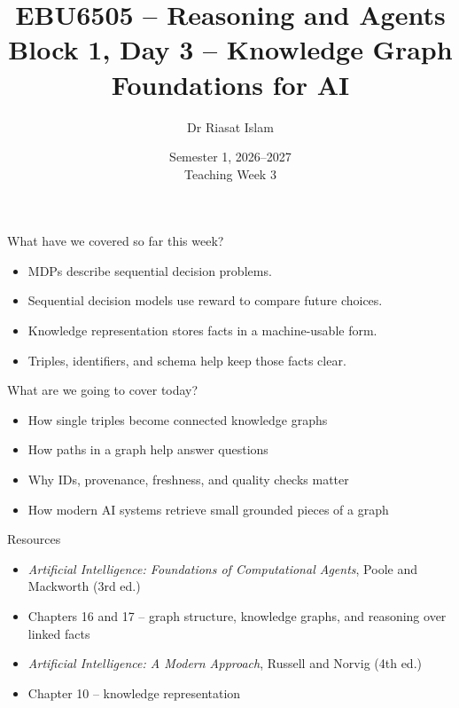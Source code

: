 \documentclass[aspectratio=169]{beamer}
\title[EBU6505 B1 D3]{EBU6505 -- Reasoning and Agents\\Block 1, Day 3 -- Knowledge Graph Foundations for AI}
\author{Dr Riasat Islam}
\institute{Queen Mary University of London}
\date[Teaching Week 3]{Semester 1, 2026--2027 \\ Teaching Week 3}
\newcommand{\defaultdeckrefs}{AIMA4e Ch.10 pp.314--343; Poole3e Ch.16--17 pp.701--766}
\newcommand{\currentsliderefs}{\defaultdeckrefs}
\newcommand{\setslideref}[1]{\gdef\currentsliderefs{#1}}
\begin{document}
\setslideref{AIMA4e Ch.10 pp.314--343; Poole3e Ch.16--17 pp.701--766}
\begin{frame}
  \titlepage
\end{frame}

\begin{frame}{What have we covered so far this week?}
\begin{itemize}
  \item MDPs describe sequential decision problems.
  \item Sequential decision models use reward to compare future choices.
  \item Knowledge representation stores facts in a machine-usable form.
  \item Triples, identifiers, and schema help keep those facts clear.
\end{itemize}
\end{frame}

\begin{frame}{What are we going to cover today?}
\begin{itemize}
  \item How single triples become connected knowledge graphs
  \item How paths in a graph help answer questions
  \item Why IDs, provenance, freshness, and quality checks matter
  \item How modern AI systems retrieve small grounded pieces of a graph
\end{itemize}
\end{frame}

\begin{frame}{Resources}
\begin{itemize}
  \item \textit{Artificial Intelligence: Foundations of Computational Agents}, Poole and Mackworth (3rd ed.)
  \item Chapters 16 and 17 -- graph structure, knowledge graphs, and reasoning over linked facts
  \item \textit{Artificial Intelligence: A Modern Approach}, Russell and Norvig (4th ed.)
  \item Chapter 10 -- knowledge representation
\end{itemize}
\end{frame}
\end{document}
